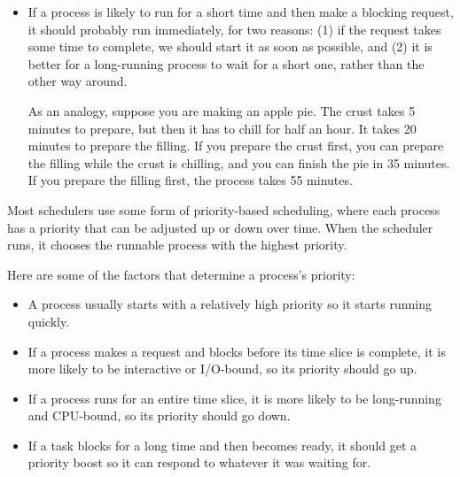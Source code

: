 \documentclass[12pt]{book}
\begin{document}
{\begin{itemize}
The operating system can sometimes classify processes based on their
past behavior, and schedule them accordingly.  For example, when an
interactive process is unblocked, it should probably run immediately,
because a user is probably waiting for a reply.  On the other hand,
a CPU-bound process that has been running for a long time might be
less time-sensitive.

\item If a process is likely to run for a short time and then make
a blocking request, it should probably run immediately, for two reasons:
(1) if the request takes some time to complete, we should start it as soon
as possible, and (2) it is better for a long-running process to wait
for a short one, rather than the other way around.

As an analogy, suppose you are making an apple pie.  The crust takes
5 minutes to prepare, but then it has to chill for half an hour.  It takes
20 minutes to prepare the filling.  If you prepare the crust first,
you can prepare the filling while the crust is chilling, and you can
finish the pie in 35 minutes.  If you prepare the filling first, the
process takes 55 minutes.

\end{itemize}

Most schedulers use some form of priority-based scheduling,
where each process has a priority that can be adjusted up or down
over time.  When the scheduler runs, it chooses the runnable process
with the highest priority.

Here are some of the factors that determine a process's priority:

\begin{itemize}

\item A process usually starts with a relatively high priority so it
  starts running quickly.

\item If a process makes a request and blocks before its time slice is
  complete, it is more likely to be interactive or I/O-bound, so its
  priority should go up.

\item If a process runs for an entire time slice, it is more likely to
  be long-running and CPU-bound, so its priority should go down.

\item If a task blocks for a long time and then becomes ready, it
  should get a priority boost so it can respond to whatever it was
  waiting for.


\end{itemize}}
\end{document}
